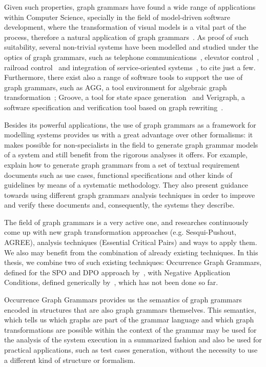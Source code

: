 Given such properties, graph grammars have found a wide range of applications within Computer Science, specially in the field of model-driven software development, where the transformation of visual models is a vital part of the process, therefore a natural application of graph grammars~\cite{Rozenberg1997}. As proof of such suitability, several non-trivial systems have been modelled and studied under the optics of graph grammars, such as telephone communications~\cite{Ribeiro1996}, elevator control~\cite{Lambers2010}, railroad control~\cite{Pennemann2009} and integration of service-oriented systems~\cite{Giese2015}, to cite just a few. Furthermore, there exist also a range of software tools to support the use of graph grammars, such as AGG, a tool environment for algebraic graph transformation~\cite{Taentzer2000}; Groove, a tool for state space generation~\cite{Rensink2004} and Verigraph, a software specification and verification tool based on graph rewriting~\cite{verigraph}.

Besides its powerful applications, the use of graph grammars as a framework for modelling systems provides us with a great advantage over other formalisms: it makes possible for non-specialists in the field to generate graph grammar models of a system and still benefit from the rigorous analyses it offers. For example, ~\cite{Junior2015,BezerraWEIT2016,Cota2017} explain how to generate graph grammars from a set of textual requirement documents such as use cases, functional specifications and other kinds of guidelines by means of a systematic methodology. They also present guidance towards using different graph grammars analysis techniques in order to improve and verify these documents and, consequently, the systems they describe.

The field of graph grammars is a very active one, and researches continuously come up with new graph transformation approaches (e.g. Sesqui-Pushout, AGREE), analysis techniques (Essential Critical Pairs) and ways to apply them. We also may benefit from the combination of already existing techniques. In this thesis, we combine two of such existing techniques: Occurrence Graph Grammars, defined for the SPO and DPO approach by~\cite{Ribeiro1996, Corradini1996}, with Negative Application Conditions, defined generically by~\cite{Habel1996}, which has not been done so far. 

Occurrence Graph Grammars provides us the semantics of graph grammars encoded in structures that are also graph grammars themselves. This semantics, which tells us which graphs are part of the grammar language and which graph transformations are possible within the context of the grammar may be used for the analysis of the system execution in a summarized fashion and also be used for practical applications, such as test cases generation, without the necessity to use a different kind of structure or formalism.

